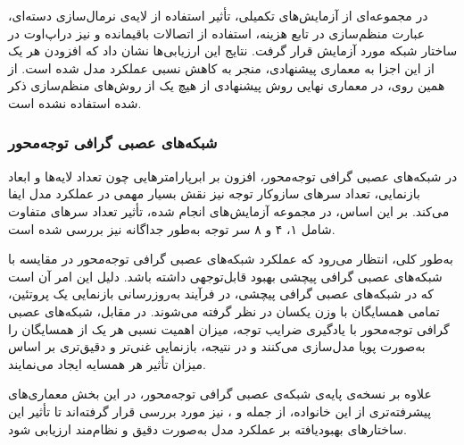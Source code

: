 در مجموعه‌ای از آزمایش‌های تکمیلی، تأثیر استفاده از لایه‌ی نرمال‌سازی دسته‌ای، عبارت منظم‌سازی  در تابع هزینه، استفاده از اتصالات باقیمانده و نیز دراپ‌اوت در ساختار شبکه مورد آزمایش قرار گرفت. نتایج این ارزیابی‌ها نشان داد که افزودن هر یک از این اجزا به معماری پیشنهادی، منجر به کاهش نسبی عملکرد مدل شده است.
از همین روی، در معماری نهایی روش پیشنهادی از هیچ یک از روش‌های منظم‌سازی ذکر شده استفاده نشده است.


\subsubsection{شبکه‌های عصبی گرافی توجه‌محور}
در شبکه‌های عصبی گرافی توجه‌محور، افزون بر ابرپارامترهایی چون تعداد لایه‌ها و ابعاد بازنمایی، تعداد سرهای سازوکار توجه نیز نقش بسیار مهمی در عملکرد مدل ایفا می‌کند. بر این اساس، در مجموعه آزمایش‌های انجام‌ شده، تأثیر تعداد سرهای متفاوت شامل ۱، ۴ و ۸ سر توجه به‌طور جداگانه نیز بررسی شده است.

 به‌طور کلی، انتظار می‌رود که عملکرد شبکه‌های عصبی گرافی توجه‌محور در مقایسه با شبکه‌های عصبی گرافی پیچشی بهبود قابل‌توجهی داشته باشد. دلیل این امر آن است که در شبکه‌های عصبی گرافی پیچشی، در فرآیند به‌روزرسانی بازنمایی یک پروتئین، تمامی همسایگان با وزن یکسان در نظر گرفته می‌شوند. در مقابل، شبکه‌های عصبی گرافی توجه‌محور با یادگیری ضرایب توجه، میزان اهمیت نسبی هر یک از همسایگان را به‌صورت پویا مدل‌سازی می‌کنند و در نتیجه، بازنمایی غنی‌تر و دقیق‌تری بر اساس میزان تأثیر هر همسایه ایجاد می‌نمایند.
 
 علاوه بر نسخه‌ی پایه‌ی شبکه‌ی عصبی گرافی توجه‌محور، در این بخش معماری‌های پیشرفته‌تری از این خانواده، از جمله  و ، نیز مورد بررسی قرار گرفته‌اند تا تأثیر این ساختارهای بهبودیافته بر عملکرد مدل به‌صورت دقیق و نظام‌مند ارزیابی شود.
 

 
